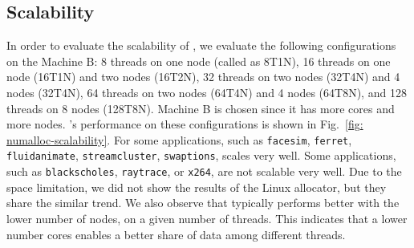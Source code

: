 \subsection{Scalability}
\label{sec:scale}

In order to evaluate the scalability of \NM{}, we evaluate the following configurations on the Machine B: 8 threads on one node (called as 8T1N), 16 threads on one node (16T1N) and two nodes (16T2N), 32 threads on two nodes (32T4N) and 4 nodes (32T4N), 64 threads on two nodes (64T4N) and 4 nodes (64T8N), and 128 threads on 8 nodes (128T8N). Machine B is chosen since it has more cores and more nodes. \NM{}'s performance on these configurations is shown in Fig.~\ref{fig: numalloc-scalability}. For some applications, such as \texttt{facesim}, \texttt{ferret}, \texttt{fluidanimate}, \texttt{streamcluster}, \texttt{swaptions}, \NM{} scales very well. Some applications, such as \texttt{blackscholes}, \texttt{raytrace}, or \texttt{x264}, are not scalable very well. Due to the space limitation, we did not show the results of the Linux allocator, but they share the similar trend. We also observe that \NM{} typically performs better with the lower number of nodes, on a given number of threads.  This indicates that a lower number cores enables a better share of data among different threads. 

